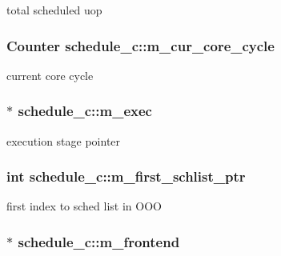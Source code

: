 \label{classschedule__c_a0dc86a2612108d557b5d9b4147b93a84}
total scheduled uop \hypertarget{classschedule__c_af4317f5116645b5847cef02ec5b6491c}{
\subsubsection[{m\_\-cur\_\-core\_\-cycle}]{\setlength{\rightskip}{0pt plus 5cm}Counter {\bf schedule\_\-c::m\_\-cur\_\-core\_\-cycle}}}
\label{classschedule__c_af4317f5116645b5847cef02ec5b6491c}
current core cycle \hypertarget{classschedule__c_a75e32c0fe0d1ad336ada30787fceafd8}{
\subsubsection[{m\_\-exec}]{$\ast$ {\bf schedule\_\-c::m\_\-exec}}}
\label{classschedule__c_a75e32c0fe0d1ad336ada30787fceafd8}
execution stage pointer \hypertarget{classschedule__c_aa8a352d3017c16bf63d36ec12541238d}{
\subsubsection[{m\_\-first\_\-schlist\_\-ptr}]{\setlength{\rightskip}{0pt plus 5cm}int {\bf schedule\_\-c::m\_\-first\_\-schlist\_\-ptr}}}
\label{classschedule__c_aa8a352d3017c16bf63d36ec12541238d}
first index to sched list in OOO \hypertarget{classschedule__c_a88ee09e9569c248374f0c943a4b73987}{
\subsubsection[{m\_\-frontend}]{$\ast$ {\bf schedule\_\-c::m\_\-frontend}}}
